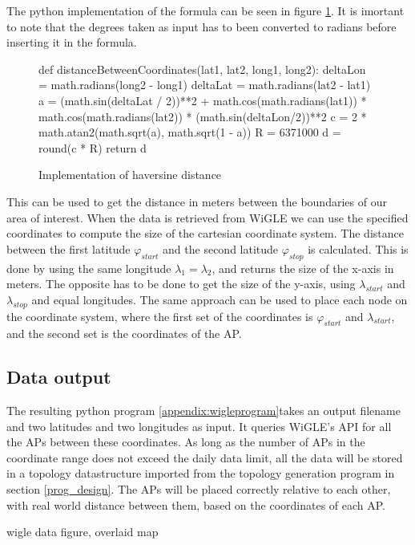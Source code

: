The python implementation of the formula can be seen in figure \ref{fig:haversine}. It is imortant to note that the degrees taken as input
has to been converted to radians before inserting it in the formula. 

	\begin{figure}[H]
		\tiny
		\begin{python}
def distanceBetweenCoordinates(lat1, lat2, long1, long2):
	deltaLon = math.radians(long2 - long1)
	deltaLat = math.radians(lat2 - lat1)
	a = (math.sin(deltaLat / 2))**2 + math.cos(math.radians(lat1)) * math.cos(math.radians(lat2)) * (math.sin(deltaLon/2))**2
	c = 2 * math.atan2(math.sqrt(a), math.sqrt(1 - a)) 
	R = 6371000
	d = round(c * R)
	return d
	\end{python}
			\caption{Implementation of haversine distance}
			\label{fig:haversine}
	\end{figure}


This can be used to get the distance in meters between the boundaries of our area of interest. When the data is retrieved from
WiGLE we can use the specified coordinates to compute the size of the cartesian coordinate system.
The distance between the first latitude $\varphi_{start}$ and the second latitude $\varphi_{stop}$
is calculated. This is done by using the same longitude  $\lambda_1 = \lambda_2$, and returns the size of the x-axis in meters.
The opposite has to be done to get the size of the y-axis, using $\lambda_{start}$ and $\lambda_{stop}$ and equal longitudes.
The same approach can be used to place each node on the coordinate system, where the first set of the coordinates is
$\varphi_{start}$ and $\lambda_{start}$, and the second set is the coordinates of the AP.
\subsection{Data output}
The resulting python program \ref{appendix:wigleprogram}takes an output filename and two latitudes and two longitudes as input. It queries WiGLE's API for all the APs between these coordinates.
As long as the number of APs in the coordinate range does not exceed the daily data limit, all the data will be stored in a topology datastructure imported 
from the topology generation program in section \ref{prog_design}. The APs will be placed correctly relative to each other, with real world distance between them,
based on the coordinates of each AP. 

{{wigle data figure, overlaid map}}

